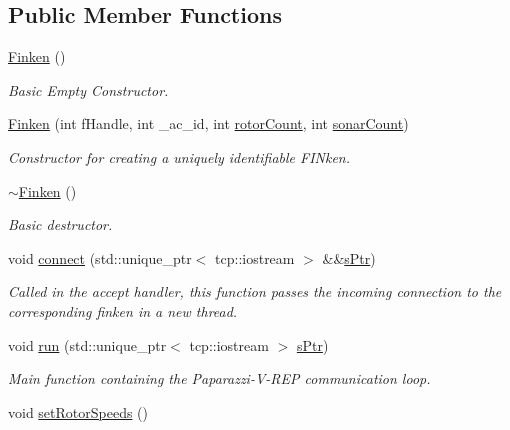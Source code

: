 \subsection*{Public Member Functions}
\begin{DoxyCompactItemize}
\item 
\hyperlink{classFinken_afb256567ee9aa96c409fdb0529b4f228}{Finken} ()
\begin{DoxyCompactList}\small\item\em Basic Empty Constructor. \end{DoxyCompactList}\item 
\hyperlink{classFinken_a26a9cd42385ec3ae010e2ad1387d9ce6}{Finken} (int f\+Handle, int \+\_\+ac\+\_\+id, int \hyperlink{classFinken_a41d179b5343816aad624ae5d567892a0}{rotor\+Count}, int \hyperlink{classFinken_acca526b76c18d3bb890d3d8adef78cfa}{sonar\+Count})
\begin{DoxyCompactList}\small\item\em Constructor for creating a uniquely identifiable F\+I\+Nken. \end{DoxyCompactList}\item 
\hyperlink{classFinken_a94e6a3b5b14ec7ee351d219eb17be45b}{$\sim$\+Finken} ()
\begin{DoxyCompactList}\small\item\em Basic destructor. \end{DoxyCompactList}\item 
void \hyperlink{classFinken_aa4779668e3bf85253e371b30e0da808a}{connect} (std\+::unique\+\_\+ptr$<$ tcp\+::iostream $>$ \&\&\hyperlink{finkenplugin_8cpp_ac7413237502a08f3a3cb45e20174e71d}{s\+Ptr})
\begin{DoxyCompactList}\small\item\em Called in the accept handler, this function passes the incoming connection to the corresponding finken in a new thread. \end{DoxyCompactList}\item 
void \hyperlink{classFinken_ae3c3abbf571407e210f4b03b68cada9d}{run} (std\+::unique\+\_\+ptr$<$ tcp\+::iostream $>$ \hyperlink{finkenplugin_8cpp_ac7413237502a08f3a3cb45e20174e71d}{s\+Ptr})
\begin{DoxyCompactList}\small\item\em Main function containing the Paparazzi-\/\+V-\/\+R\+EP communication loop. \end{DoxyCompactList}\item 
void \hyperlink{classFinken_aaead1098c0752c8ec5b99bccd9945f3b}{set\+Rotor\+Speeds} ()

\end{DoxyCompactItemize}

